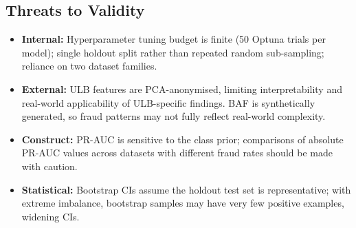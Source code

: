 \subsection{Threats to Validity}
\begin{itemize}
  \item \textbf{Internal:} Hyperparameter tuning budget is finite
    (50 Optuna trials per model); single holdout split rather
    than repeated random sub-sampling; reliance on two dataset families.
  \item \textbf{External:} ULB features are PCA-anonymised, limiting
    interpretability and real-world applicability of ULB-specific findings.
    BAF is synthetically generated, so fraud patterns may not fully
    reflect real-world complexity.
  \item \textbf{Construct:} PR-AUC is sensitive to the class prior;
    comparisons of absolute PR-AUC values across datasets with different
    fraud rates should be made with caution.
  \item \textbf{Statistical:} Bootstrap CIs assume the holdout test set
    is representative; with extreme imbalance, bootstrap samples may
    have very few positive examples, widening CIs.
\end{itemize}
